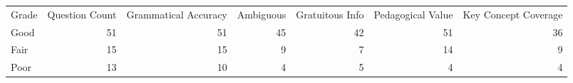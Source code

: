 \begin{tabular}{lrrrrrr}
Grade & Question Count & Grammatical Accuracy & Ambiguous & Gratuitous Info & Pedagogical Value & Key Concept Coverage \\
Good & 51 & 51 & 45 & 42 & 51 & 36 \\
Fair & 15 & 15 & 9 & 7 & 14 & 9 \\
Poor & 13 & 10 & 4 & 5 & 4 & 4 \\
\end{tabular}
